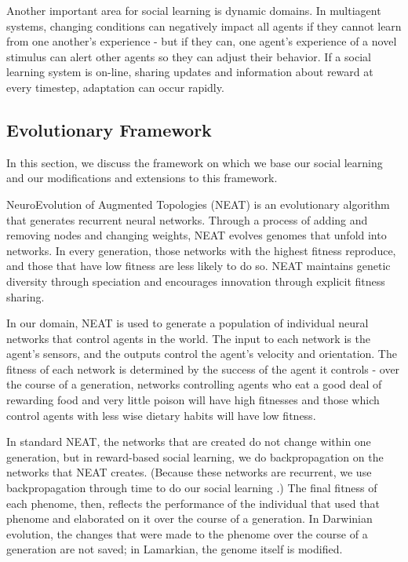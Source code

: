 \documentclass{acm_proc_article-sp}
\begin{document}
Another important area for social learning is dynamic domains. In multiagent systems, changing conditions can negatively impact all agents if they cannot learn from one another's experience - but if they can, one agent's experience of a novel stimulus can alert other agents so they can adjust their behavior. If a social learning system is on-line, sharing updates and information about reward at every timestep, adaptation can occur rapidly.

\subsection*{Evolutionary Framework}
In this section, we discuss the framework on which we base our social learning and our modifications and extensions to this framework.

NeuroEvolution of Augmented Topologies (NEAT)\cite{stanley2002evolving} is an evolutionary algorithm that generates recurrent neural networks. Through a process of adding and removing nodes and changing weights, NEAT evolves genomes that unfold into networks. In every generation, those networks with the highest fitness reproduce, and those that have low fitness are less likely to do so. NEAT maintains genetic diversity through speciation and encourages innovation through explicit fitness sharing.

In our domain, NEAT is used to generate a population of individual neural networks that control agents in the world. The input to each network is the agent's sensors, and the outputs control the agent's velocity and orientation. The fitness of each network is determined by the success of the agent it controls - over the course of a generation, networks controlling agents who eat a good deal of rewarding food and very little poison will have high fitnesses and those which control agents with less wise dietary habits will have low fitness.

In standard NEAT, the networks that are created do not change within one generation, but in reward-based social learning, we do backpropagation\cite{rumelhart1986learning} on the networks that NEAT creates. (Because these networks are recurrent, we use backpropagation through time to do our social learning \cite{werbos1990backpropagation}.) The final fitness of each phenome, then, reflects the performance of the individual that used that phenome and elaborated on it over the course of a generation. In Darwinian evolution, the changes that were made to the phenome over the course of a generation are not saved; in Lamarkian, the genome itself is modified.
\end{document}
